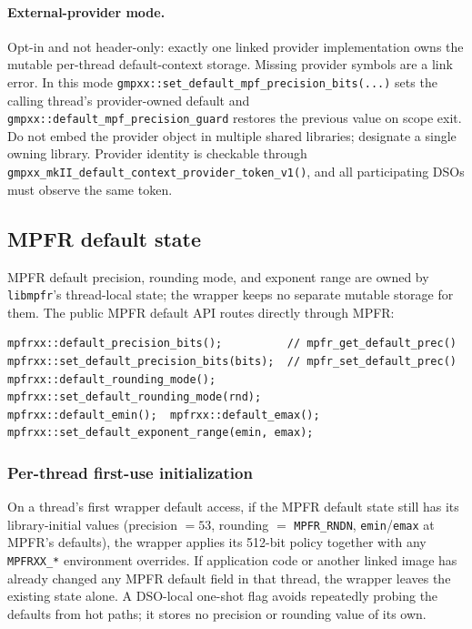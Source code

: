 \documentclass[11pt,a4paper]{article}
\newcommand{\code}[1]{\lstinline!#1!}
\begin{document}
\paragraph{External-provider mode.}
Opt-in and not header-only: exactly one linked provider implementation owns the
mutable per-thread default-context storage. Missing provider symbols are a link
error. In this mode \code{gmpxx::set_default_mpf_precision_bits(...)} sets the
calling thread's provider-owned default and
\code{gmpxx::default_mpf_precision_guard} restores the previous value on scope
exit. Do not embed the provider object in multiple shared libraries; designate a
single owning library. Provider identity is checkable through
\code{gmpxx_mkII_default_context_provider_token_v1()}, and all participating DSOs
must observe the same token.

\subsection{MPFR default state}

MPFR default precision, rounding mode, and exponent range are owned by
\code{libmpfr}'s thread-local state; the wrapper keeps no separate mutable
storage for them. The public MPFR default API routes directly through MPFR:

\begin{lstlisting}
mpfrxx::default_precision_bits();          // mpfr_get_default_prec()
mpfrxx::set_default_precision_bits(bits);  // mpfr_set_default_prec()
mpfrxx::default_rounding_mode();
mpfrxx::set_default_rounding_mode(rnd);
mpfrxx::default_emin();  mpfrxx::default_emax();
mpfrxx::set_default_exponent_range(emin, emax);
\end{lstlisting}

\subsubsection{Per-thread first-use initialization}

On a thread's first wrapper default access, if the MPFR default state still has
its library-initial values (precision $=53$, rounding $=$ \code{MPFR_RNDN},
\code{emin}/\code{emax} at MPFR's defaults), the wrapper applies its 512-bit
policy together with any \code{MPFRXX_*} environment overrides. If application
code or another linked image has already changed any MPFR default field in that
thread, the wrapper leaves the existing state alone. A DSO-local one-shot flag
avoids repeatedly probing the defaults from hot paths; it stores no precision or
rounding value of its own.
\end{document}
